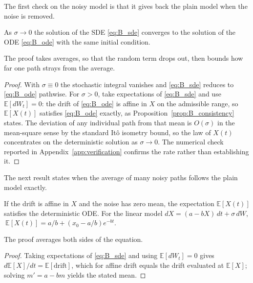The first check on the noisy model is that it gives back the plain model when
the noise is removed.

\begin{proposition}
\label{prop:B_reduction}
As $\sigma\to0$ the solution of the SDE \eqref{eq:B_sde} converges to the
solution of the ODE \eqref{eq:B_ode} with the same initial condition.
\end{proposition}
The proof takes averages, so that the random term drops out, then bounds how
far one path strays from the average.
\begin{proof}
With $\sigma\equiv0$ the stochastic integral vanishes and \eqref{eq:B_sde}
reduces to \eqref{eq:B_ode} pathwise. For $\sigma>0$, take expectations of
\eqref{eq:B_sde} and use $\mathbb E[dW_t]=0$: the drift of \eqref{eq:B_ode} is
affine in $X$ on the admissible range, so $\mathbb E[X(t)]$ satisfies
\eqref{eq:B_ode} exactly, as Proposition~\ref{prop:B_consistency} states. The
deviation of any individual path from that mean is $O(\sigma)$ in the
mean-square sense by the standard It\^o isometry bound, so the law of $X(t)$
concentrates on the deterministic solution as $\sigma\to0$. The numerical
check reported in Appendix~\ref{app:verification} confirms the rate rather than
establishing it.
\end{proof}

The next result states when the average of many noisy paths follows the plain
model exactly.

\begin{proposition}
\label{prop:B_consistency}
If the drift is affine in $X$ and the noise has zero mean, the expectation
$\mathbb{E}[X(t)]$ satisfies the deterministic ODE. For the linear model
$dX=(a-bX)\,dt+\sigma\,dW$, $\ \mathbb{E}[X(t)]=a/b+(x_0-a/b)e^{-bt}$.
\end{proposition}
The proof averages both sides of the equation.
\begin{proof}
Taking expectations of \eqref{eq:B_sde} and using $\mathbb{E}[dW_t]=0$ gives
$d\mathbb{E}[X]/dt=\mathbb{E}[\text{drift}]$, which for affine drift equals the
drift evaluated at $\mathbb{E}[X]$; solving $m'=a-bm$ yields the stated mean.
\end{proof}

